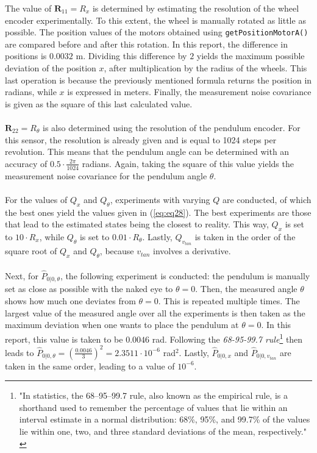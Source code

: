 \documentclass[a4paper,kul]{kulakarticle} %
\begin{document}
\noindent The value of $\mathbf{R}_{11} = R_x$ is determined by estimating the resolution of the wheel encoder experimentally. To this extent, the wheel is manually rotated as little as possible. The position values of the motors obtained using \texttt{getPositionMotorA()} are compared before and after this rotation. In this report, the difference in positions is $0.0032$ m. Dividing this difference by $2$ yields the maximum possible deviation of the position $x$, after multiplication by the radius of the wheels.  This last operation is because the previously mentioned formula returns the position in radians, while $x$ is expressed in meters. Finally, the measurement noise covariance is given as the square of this last calculated value.
\\\\
$\mathbf{R}_{22} = R_\theta$ is also determined using the resolution of the pendulum encoder. For this sensor, the resolution is already given and is equal to 1024 steps per revolution. This means that the pendulum angle can be determined with an accuracy of $0.5\cdot\frac{2\pi}{1024}$ radians. Again, taking the square of this value yields the measurement noise covariance for the pendulum angle $\theta$. 
\\\\
For the values of $Q_x$ and $Q_\theta$, experiments with varying $Q$ are conducted, of which the best ones yield the values given in (\ref{eq:eq28}). The best experiments are those that lead to the estimated states being the closest to reality. This way, $Q_x$ is set to $10\cdot R_x$, while $Q_\theta$ is set to $0.01 \cdot R_\theta$. Lastly, $Q_{v_{tan}}$ is taken in the order of the square root of $Q_x$ and $Q_\theta$, because $v_{tan}$ involves a derivative.
\\\\
Next, for $\hat{P}_{0|0, \theta}$, the following experiment is conducted: the pendulum is manually set as close as possible with the naked eye to $\theta = 0$. Then, the measured angle $\theta$ shows how much one deviates from $\theta = 0$. This is repeated multiple times. The largest value of the measured angle over all the experiments is then taken as the maximum deviation when one wants to place the pendulum at $\theta = 0$. In this report, this value is taken to be $0.0046$ rad. Following the \textit{68-95-99.7 rule}\footnote{"In statistics, the 68–95–99.7 rule, also known as the empirical rule, is a shorthand used to remember the percentage of values that lie within an interval estimate in a normal distribution: 68\%, 95\%, and 99.7\% of the values lie within one, two, and three standard deviations of the mean, respectively." \cite{68rule}} then leads to $\hat{P}_{0|0, \theta} = \left(\frac{0.0046}{3}\right)^2 = 2.3511\cdot 10^{-6}$ rad$^2$. Lastly, $\hat{P}_{0|0, x}$ and $\hat{P}_{0|0, v_{tan}}$ are taken in the same order, leading to a value of $10^{-6}$.
\end{document}
